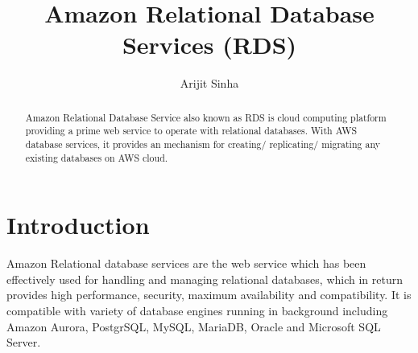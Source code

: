 
\title{Amazon Relational Database Services (RDS)}

\author{Arijit Sinha}

\renewcommand{\shortauthors}{A.Sinha}

\begin{abstract}
Amazon Relational Database Service also known as RDS is cloud computing
platform providing a prime web service to operate with relational databases. 
With AWS database services, it provides an mechanism for 
creating/ replicating/ migrating any existing databases on AWS cloud.

\end{abstract}


\maketitle

\section{Introduction}
Amazon Relational database services are the web service which has been 
effectively used for  handling and managing relational databases, which 
in return provides high performance, security, maximum availability and 
compatibility. 
It is compatible with variety of database engines running in background 
including Amazon Aurora, PostgrSQL, MySQL, MariaDB, Oracle and 
Microsoft SQL Server.

